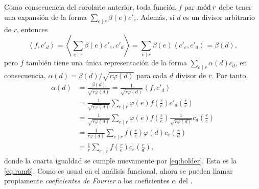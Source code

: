 Como consecuencia del corolario anterior, toda función $f$ par $\mathrm{m\acute{o}d\:}r$ debe tener una expansión de la forma $\sum_{e \mid r} \beta(e) c'_e$. Además, si $d$ es un divisor arbitrario de $r$, entonces
\begin{equation*}
    \left\langle f, c'_d \right\rangle = \left\langle \sum_{e \mid r} \beta(e) c'_e,c'_d \right\rangle = \sum_{e \mid r} \beta(e) \left\langle c'_e,c'_d \right\rangle = \beta(d),
\end{equation*}
pero $f$ también tiene una única representación de la forma $\sum_{e \mid r} \alpha(d) c_d$, en consecuencia, $\alpha(d) = \beta(d)/\sqrt{r \varphi(d)}$ para cada $d$ divisor de $r$. Por tanto,
\begin{align*}
    \alpha(d) & = \frac{\beta(d)}{\sqrt{r \varphi(d)}} = \frac{1}{\sqrt{r \varphi(d)}} \left\langle f, c'_d \right\rangle \\
                                                     & = \frac{1}{\sqrt{r \varphi(d)}} \sum_{e \mid r} \varphi(e) f \left( \frac{r}{e} \right) c'_d \left( \frac{r}{e} \right) \\
                                                     & = \frac{1}{\sqrt{r \varphi(d)}} \sum_{e \mid r} \varphi(e) f \left( \frac{r}{e} \right) \frac{1}{\sqrt{r \varphi(d)}} c_d \left( \frac{r}{e} \right) \\
                                                     & = \frac{1}{r \varphi(d)} \sum_{e \mid r} f \left( \frac{r}{e} \right) \varphi(d) c_e \left( \frac{r}{d} \right) \\
                                                     & = \frac{1}{r} \sum_{e \mid r} f \left( \frac{r}{e} \right) c_e \left( \frac{r}{d} \right),
\end{align*}
donde la cuarta igualdad se cumple nuevamente por \eqref{eq:holder}. Esta es la \cref{eq:ram6}. Como es usual en el análisis funcional, ahora se pueden llamar propiamente \emph{coeficientes de Fourier} a los coeficientes $\alpha$ del .
